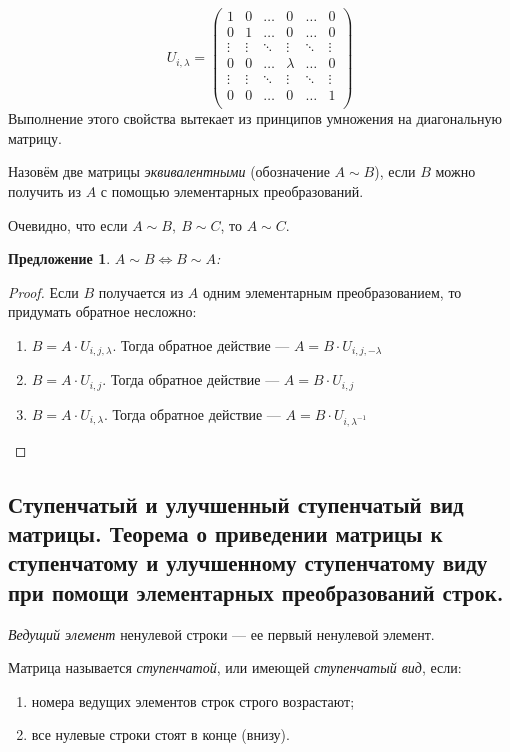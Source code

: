 \documentclass[a4paper, 12pt]{article}
\newtheorem*{proposal}{Предложение}
\begin{document}
\[
    U_{i, \lambda} =
    \begin{pmatrix}
        1       &0      &\ldots &0      &\ldots &0\\
        0       &1      &\ldots &0      &\ldots &0\\
        \vdots  &\vdots &\ddots &\vdots &\ddots &\vdots\\
        0       &0      &\ldots &\lambda&\ldots &0\\
        \vdots  &\vdots &\ddots &\vdots &\ddots &\vdots\\
        0       &0      &\ldots &0      &\ldots &1\\
    \end{pmatrix}
\]
Выполнение этого свойства вытекает из принципов умножения на диагональную матрицу.

Назовём две матрицы \emph{эквивалентными} (обозначение $A\sim B$), если $B$ можно получить из $A$ с помощью элементарных преобразований.

Очевидно, что если $A\sim B,\ B\sim C$, то $A\sim C$.
\begin{proposal}
    $A\sim B \iff B\sim A$:
\end{proposal}
\begin{proof}
    Если $B$ получается из $A$ одним элементарным преобразованием, то придумать обратное несложно:
    \begin{enumerate}
        \item $B = A\cdot U_{i,j,\lambda}$. Тогда обратное действие --- $A = B\cdot U_{i, j, -\lambda}$
        \item $B = A\cdot U_{i,j}$. Тогда обратное действие --- $A = B\cdot U_{i, j}$
        \item $B = A\cdot U_{i,\lambda}$. Тогда обратное действие --- $A = B\cdot U_{i, \lambda^{-1}}$
    \end{enumerate}
\end{proof}

\subsection{Ступенчатый и улучшенный ступенчатый вид матрицы. Теорема о приведении матрицы к ступенчатому и улучшенному ступенчатому виду при помощи элементарных преобразований строк.}
\textit{Ведущий элемент} ненулевой строки — ее первый ненулевой элемент.

Матрица называется \textit{ступенчатой}, или имеющей \textit{ступенчатый вид}, если:
\begin{enumerate}
\item номера ведущих элементов строк строго возрастают;
\item все нулевые строки стоят в конце (внизу).
\end{enumerate}
\end{document}
